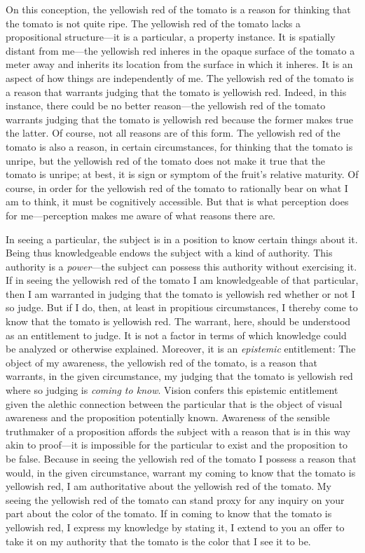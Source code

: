 \documentclass[12pt]{article}
\begin{document}
On this conception, the yellowish red of the tomato is a reason for thinking that the tomato is not quite ripe. The yellowish red of the tomato lacks a propositional structure---it is a particular, a property instance. It is spatially distant from me---the yellowish red inheres in the opaque surface of the tomato a meter away and inherits its location from the surface in which it inheres. It is an aspect of how things are independently of me. The yellowish red of the tomato is a reason that warrants judging that the tomato is yellowish red. Indeed, in this instance, there could be no better reason---the yellowish red of the tomato warrants judging that the tomato is yellowish red because the former makes true the latter. Of course, not all reasons are of this form. The yellowish red of the tomato is also a reason, in certain circumstances, for thinking that the tomato is unripe, but the yellowish red of the tomato does not make it true that the tomato is unripe; at best, it is sign or symptom of the fruit's relative maturity. Of course, in order for the yellowish red of the tomato to rationally bear on what I am to think, it must be cognitively accessible. But that is what perception does for me---perception makes me aware of what reasons there are. 

In seeing a particular, the subject is in a position to know certain things about it. Being thus knowledgeable endows the subject with a kind of authority. This authority is a \emph{power}---the subject can possess this authority without exercising it. If in seeing the yellowish red of the tomato I am knowledgeable of that particular, then I am warranted in judging that the tomato is yellowish red whether or not I so judge. But if I do, then, at least in propitious circumstances, I thereby come to know that the tomato is yellowish red. The warrant, here, should be understood as an entitlement to judge. It is not a factor in terms of which knowledge could be analyzed or otherwise explained. Moreover, it is an \emph{epistemic} entitlement: The object of my awareness, the yellowish red of the tomato, is a reason that warrants, in the given circumstance, my judging that the tomato is yellowish red where so judging is \emph{coming to know}. Vision confers this epistemic entitlement given the alethic connection between the particular that is the object of visual awareness and the proposition potentially known. Awareness of the sensible truthmaker of a proposition affords the subject with a reason that is in this way akin to proof---it is impossible for the particular to exist and the proposition to be false. Because in seeing the yellowish red of the tomato I possess a reason that would, in the given circumstance, warrant my coming to know that the tomato is yellowish red, I am authoritative about the yellowish red of the tomato. My seeing the yellowish red of the tomato can stand proxy for any inquiry on your part about the color of the tomato. If in coming to know that the tomato is yellowish red, I express my knowledge by stating it, I extend to you an offer to take it on my authority that the tomato is the color that I see it to be. 
\end{document}
